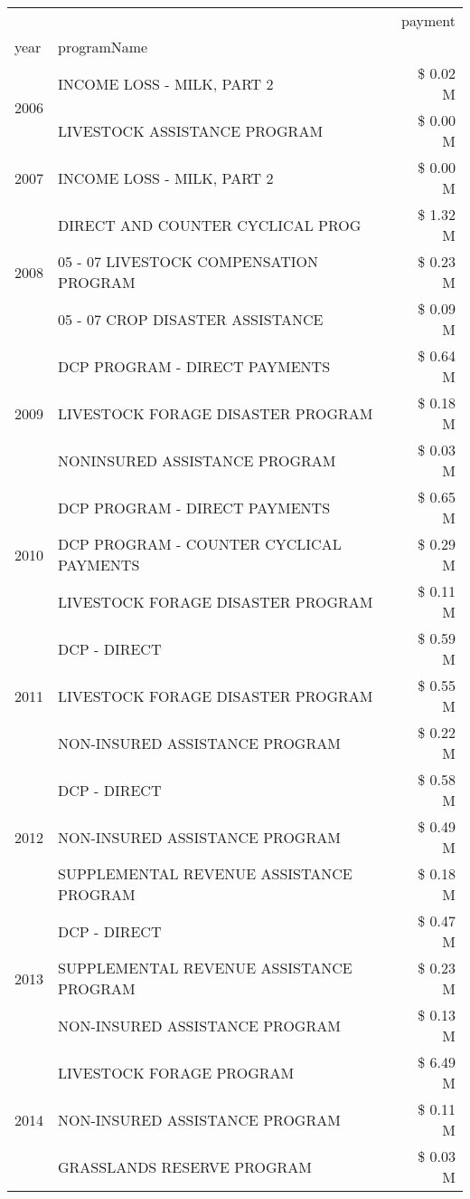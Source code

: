 \begin{tabular}{llr}
\toprule
 &  & payment \\
year & programName &  \\
\midrule
\multirow[t]{2}{*}{2006} & INCOME LOSS - MILK, PART 2 & \$ 0.02 M \\
 & LIVESTOCK ASSISTANCE PROGRAM & \$ 0.00 M \\
\cline{1-3}
2007 & INCOME LOSS - MILK, PART 2 & \$ 0.00 M \\
\cline{1-3}
\multirow[t]{3}{*}{2008} & DIRECT AND COUNTER CYCLICAL PROG & \$ 1.32 M \\
 & 05 - 07 LIVESTOCK COMPENSATION PROGRAM & \$ 0.23 M \\
 & 05 - 07 CROP DISASTER ASSISTANCE & \$ 0.09 M \\
\cline{1-3}
\multirow[t]{3}{*}{2009} & DCP PROGRAM - DIRECT PAYMENTS & \$ 0.64 M \\
 & LIVESTOCK FORAGE DISASTER  PROGRAM & \$ 0.18 M \\
 & NONINSURED ASSISTANCE PROGRAM & \$ 0.03 M \\
\cline{1-3}
\multirow[t]{3}{*}{2010} & DCP PROGRAM - DIRECT PAYMENTS & \$ 0.65 M \\
 & DCP PROGRAM - COUNTER CYCLICAL PAYMENTS & \$ 0.29 M \\
 & LIVESTOCK FORAGE DISASTER  PROGRAM & \$ 0.11 M \\
\cline{1-3}
\multirow[t]{3}{*}{2011} & DCP - DIRECT & \$ 0.59 M \\
 & LIVESTOCK FORAGE DISASTER PROGRAM & \$ 0.55 M \\
 & NON-INSURED ASSISTANCE PROGRAM & \$ 0.22 M \\
\cline{1-3}
\multirow[t]{3}{*}{2012} & DCP - DIRECT & \$ 0.58 M \\
 & NON-INSURED ASSISTANCE PROGRAM & \$ 0.49 M \\
 & SUPPLEMENTAL REVENUE ASSISTANCE PROGRAM & \$ 0.18 M \\
\cline{1-3}
\multirow[t]{3}{*}{2013} & DCP - DIRECT & \$ 0.47 M \\
 & SUPPLEMENTAL REVENUE ASSISTANCE PROGRAM & \$ 0.23 M \\
 & NON-INSURED ASSISTANCE PROGRAM & \$ 0.13 M \\
\cline{1-3}
\multirow[t]{3}{*}{2014} & LIVESTOCK FORAGE PROGRAM & \$ 6.49 M \\
 & NON-INSURED ASSISTANCE PROGRAM & \$ 0.11 M \\
 & GRASSLANDS RESERVE PROGRAM & \$ 0.03 M \\

\end{tabular}
